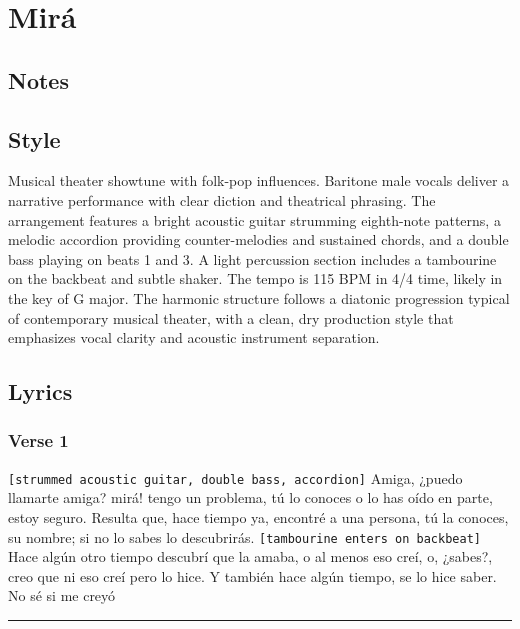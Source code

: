 \section{Mirá}\label{miruxe1}

\subsection{Notes}\label{notes-25}

\subsection{Style}\label{style-24}

Musical theater showtune with folk-pop influences. Baritone male vocals
deliver a narrative performance with clear diction and theatrical
phrasing. The arrangement features a bright acoustic guitar strumming
eighth-note patterns, a melodic accordion providing counter-melodies and
sustained chords, and a double bass playing on beats 1 and 3. A light
percussion section includes a tambourine on the backbeat and subtle
shaker. The tempo is 115 BPM in 4/4 time, likely in the key of G major.
The harmonic structure follows a diatonic progression typical of
contemporary musical theater, with a clean, dry production style that
emphasizes vocal clarity and acoustic instrument separation.

\subsection{Lyrics}\label{lyrics-24}

\subsubsection{Verse 1}\label{verse-1-20}

\texttt{{[}strummed\ acoustic\ guitar,\ double\ bass,\ accordion{]}}
Amiga, ¿puedo llamarte amiga? mirá! tengo un problema, tú lo conoces o
lo has oído en parte, estoy seguro. Resulta que, hace tiempo ya,
encontré a una persona, tú la conoces, su nombre; si no lo sabes lo
descubrirás. \texttt{{[}tambourine\ enters\ on\ backbeat{]}} Hace algún
otro tiempo descubrí que la amaba, o al menos eso creí, o, ¿sabes?, creo
que ni eso creí pero lo hice. Y también hace algún tiempo, se lo hice
saber. No sé si me creyó

\begin{center}\rule{0.5\linewidth}{0.5pt}\end{center}


